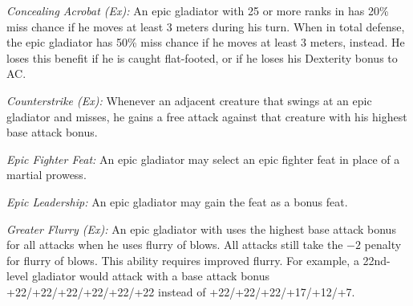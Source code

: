 \textit{Concealing Acrobat (Ex):} An epic gladiator with 25 or more ranks in  has 20\% miss chance if he moves at least 3 meters during his turn. When in total defense, the epic gladiator has 50\% miss chance if he moves at least 3 meters, instead. He loses this benefit if he is caught flat-footed, or if he loses his Dexterity bonus to AC.




\textit{Counterstrike (Ex):} Whenever an adjacent creature that swings at an epic gladiator and misses, he gains a free attack against that creature with his highest base attack bonus.

\textit{Epic Fighter Feat:} An epic gladiator may select an epic fighter feat in place of a martial prowess.

\textit{Epic Leadership:} An epic gladiator may gain the  feat as a bonus feat.


\textit{Greater Flurry (Ex):} An epic gladiator with uses the highest base attack bonus for all attacks when he uses flurry of blows. All attacks still take the $-2$ penalty for flurry of blows. This ability requires improved flurry. For example, a 22nd-level gladiator would attack with a base attack bonus +22/+22/+22/+22/+22/+22 instead of +22/+22/+22/+17/+12/+7.

